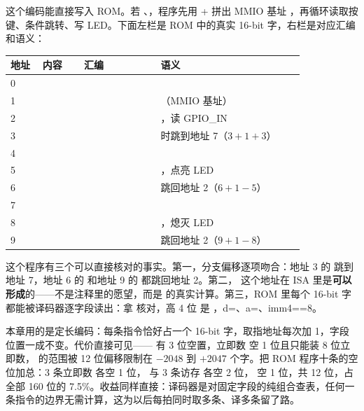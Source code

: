 这个编码能直接写入 ROM。若 、，程序先用 + 拼出 MMIO 基址 ，再循环读取按键、条件跳转、写 LED。下面左栏是 ROM 中的真实 16-bit 字，右栏是对应汇编和语义：

\begin{longtable}{L{0.1\linewidth}L{0.13\linewidth}L{0.24\linewidth}L{0.45\linewidth}}
\toprule
地址 & 内容 & 汇编 & 语义 \\
 &  &  &  \\
1 &  &  & （MMIO 基址） \\
2 &  &  & ，读 GPIO\_IN \\
3 &  &  &  时跳到地址 7（$3+1+3$） \\
4 &  &  &  \\
5 &  &  & ，点亮 LED \\
6 &  &  & 跳回地址 2（$6+1-5$） \\
7 &  &  &  \\
8 &  &  & ，熄灭 LED \\
9 &  &  & 跳回地址 2（$9+1-8$） \\
\bottomrule
\end{longtable}

这个程序有三个可以直接核对的事实。第一，分支偏移逐项吻合：地址 3 的  跳到地址 7，地址 6 的  和地址 9 的  都跳回地址 2。第二， 这个地址在 ISA 里是\textbf{可以形成}的——不是注释里的愿望，而是  的真实计算。第三，ROM 里每个 16-bit 字都能被译码器逐字段读出：拿  核对，高 4 位  是 ，d=、a=、imm4==8。

本章用的是定长编码：每条指令恰好占一个 16-bit 字，取指地址每次加 1，字段位置一成不变。代价直接可见—— 有 3 位空置，立即数  空 1 位且只能装 8 位立即数， 的范围被 12 位偏移限制在 $-2048$ 到 $+2047$ 个字。把 ROM 程序十条的空位加总：3 条立即数  各空 1 位， 与 3 条访存  各空 2 位， 空 1 位，共 12 位，占全部 160 位的 7.5\%。收益同样直接：译码器是对固定字段的纯组合查表，任何一条指令的边界无需计算，这为以后每拍同时取多条、译多条留了路。

